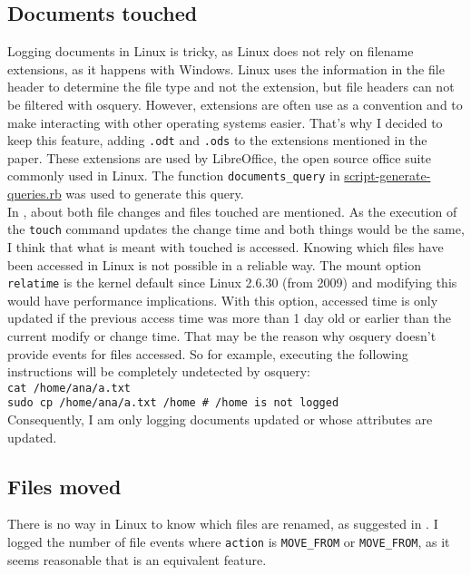 \documentclass[oneside, 12pt]{article}
\begin{document}
\subsection{Documents touched}
\label{sec:doc}

Logging documents in Linux is tricky, as Linux does not rely on filename extensions, as it happens with Windows.
Linux uses the information in the file header to determine the file type and not the extension, but file headers can not be filtered with osquery.
However, extensions are often use as a convention and to make interacting with other operating systems easier.
That's why I decided to keep this feature, adding \texttt{.odt} and \texttt{.ods} to the extensions mentioned in the paper.
These extensions are used by LibreOffice, the open source office suite commonly used in Linux.
The function \texttt{documents\_query} in \href{https://github.com/Ana06/are-you-you/blob/master/script-generate-queries.rb#L23}{script-generate-queries.rb} was used to generate this query.\\

In \cite{ruu_journal}, about both file changes and files touched are mentioned.
As the execution of the \texttt{touch} command updates the change time and both things would be the same, I think that what is meant with touched is accessed.
Knowing which files have been accessed in Linux is not possible in a reliable way.
The mount option \texttt{relatime} is the kernel default since Linux 2.6.30 (from 2009) and modifying this would have performance implications.
With this option, accessed time is only updated if the previous access time was more than 1 day old or earlier than the current modify or change time.
That may be the reason why osquery doesn't provide events for files accessed.
So for example, executing the following instructions will be completely undetected by osquery:\\

\texttt{cat /home/ana/a.txt}\\
\texttt{sudo cp /home/ana/a.txt /home  \qquad\# /home is not logged}\\

Consequently, I am only logging documents updated or whose attributes are updated.


\subsection{Files moved}

There is no way in Linux to know which files are renamed, as suggested in \cite{ruu_journal}.
I logged the number of file events where \texttt{action} is \texttt{MOVE\_FROM} or \texttt{MOVE\_FROM}, as it seems reasonable that is an equivalent feature.
\end{document}
